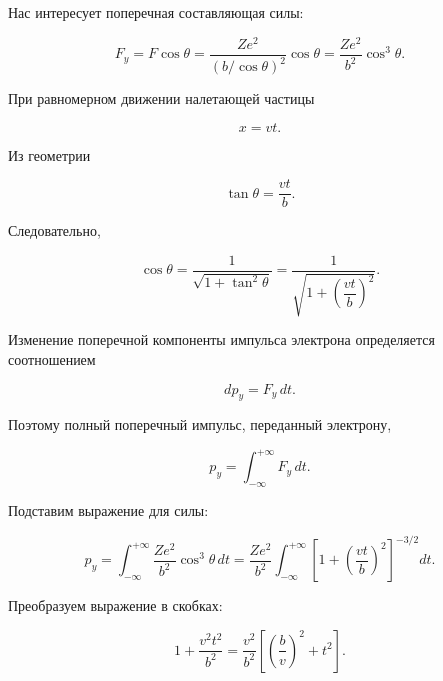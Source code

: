 \documentclass[../final.tex]{subfiles}
\begin{document}
Нас интересует поперечная составляющая силы:

\begin{equation*}
    F_y
    =
    F\cos\theta
    =
    \frac{Ze^2}{
        \left(
            b/\cos\theta
        \right)^2
    }
    \cos\theta
    =
    \frac{Ze^2}{b^2}
    \cos^3\theta.
\end{equation*}

При равномерном движении налетающей частицы

\begin{equation*}
    x=vt.
\end{equation*}

Из геометрии

\begin{equation*}
    \tan\theta
    =
    \frac{vt}{b}.
\end{equation*}

Следовательно,

\begin{equation*}
    \cos\theta
    =
    \frac{1}{
        \sqrt{
            1+\tan^2\theta
        }
    }
    =
    \frac{1}{
        \sqrt{
            1+
            \left(
                \dfrac{vt}{b}
            \right)^2
        }
    }.
\end{equation*}

Изменение поперечной компоненты импульса электрона определяется
соотношением

\begin{equation*}
    dp_y
    =
    F_y\,dt.
\end{equation*}

Поэтому полный поперечный импульс, переданный электрону,

\begin{equation*}
    p_y
    =
    \int_{-\infty}^{+\infty}
    F_y\,dt.
\end{equation*}

Подставим выражение для силы:

\begin{equation*}
    p_y
    =
    \int_{-\infty}^{+\infty}
    \frac{Ze^2}{b^2}
    \cos^3\theta\,dt
    =
    \frac{Ze^2}{b^2}
    \int_{-\infty}^{+\infty}
    \left[
        1+
        \left(
            \frac{vt}{b}
        \right)^2
    \right]^{-3/2}
    dt.
\end{equation*}

Преобразуем выражение в скобках:

\begin{equation*}
    1+
    \frac{v^2t^2}{b^2}
    =
    \frac{v^2}{b^2}
    \left[
        \left(
            \frac{b}{v}
        \right)^2
        +
        t^2
    \right].
\end{equation*}
\end{document}
